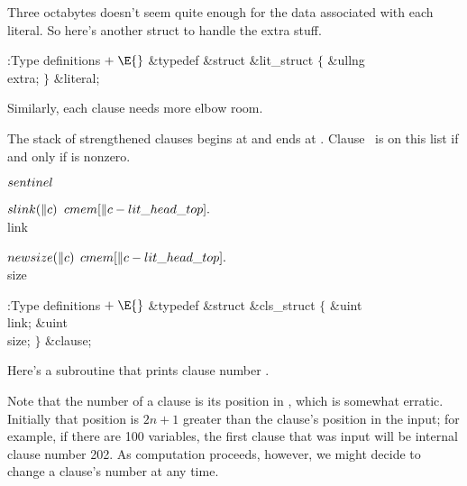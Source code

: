 Three octabytes doesn't seem quite enough for the data
associated with
each literal. So here's another struct to handle the extra stuff.

\Y\B\4:Type definitions\X${}\mathrel+\E{}$\6
\&{typedef} \&{struct} \&{lit\_struct} ${}\{{}$\1\6
\&{ullng} \\{extra};\2\6
${}\}{}$ \&{literal};\par
\fi

Similarly, each clause needs more elbow room.

The stack of strengthened clauses begins at  and ends at
. Clause~ is on this list if and only if  is nonzero.

\Y\B\4\D$\\{sentinel}$ \5
\par
\B\4\D$\\{slink}(\|c)$ \5
$\\{cmem}[\|c-\\{lit\_head\_top}].{}$\\{link}\par
\B\4\D$\\{newsize}(\|c)$ \5
$\\{cmem}[\|c-\\{lit\_head\_top}].{}$\\{size}\par
\Y\B\4:Type definitions\X${}\mathrel+\E{}$\6
\&{typedef} \&{struct} \&{cls\_struct} ${}\{{}$\1\6
\&{uint} \\{link};\6
\&{uint} \\{size};\2\6
${}\}{}$ \&{clause};\par
\fi

Here's a subroutine that prints clause number .

Note that the number of a clause is its position in , which is
somewhat erratic. Initially that position is
$2n+1$ greater than the clause's position in the input; for example, if
there are 100 variables, the first clause that was input will be
internal clause number 202. As computation proceeds, however, we might
decide to change a clause's number at any time.

